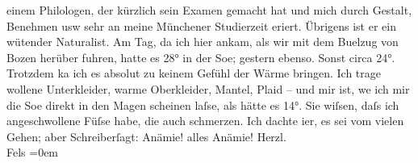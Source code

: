 \begin{ledgroupsized}[t]{13cm}
               einem Philologen, der kürzlich sein Examen gemacht hat und mich durch Gestalt,
               Benehmen usw sehr an meine Münchener
               Studierzeit eri{\geminationn}ert. Übrigens ist er ein wütender
               Naturalist.\pend
           \pstart
           Am Tag, da ich hier ankam, als wir mit dem Bu{\geminationm}elzug von
                  Bozen herüber fuhren, hatte es 28° in der
                  So{\geminationn}e; gestern ebenso. Sonst circa 24°. {\pb}Trotzdem ka{\geminationn} ich es
               absolut zu keinem Gefühl der Wärme bringen. Ich trage wollene Unterkleider, warme
               Oberkleider, Mantel, Plaid – und mir ist, we{\geminationn} ich mir
               die So{\geminationn}e direkt in den Magen scheinen laſse, als hätte
               es 14°.\pend
           \pstart
           Sie wiſsen, daſs ich angeschwollene Füſse habe, die auch schmerzen. Ich dachte i{\geminationm}er, es sei vom vielen Gehen; aber Schreiberſagt: Anämie! alles Anämie!\pend
           \pstart
           Herzl. {\\[\baselineskip]}\spacefill\mbox{Fels}\pend
           \leftskip=0em{}
         
         \endnumbering{}\end{ledgroupsized}  \newcommand{\dateiname}{L00177}\newcommand{\titel}{Friedrich M. Fels an Arthur Schnitzler, 1[7]. 2. 1893}\newcommand{\editorInnen}{Martin Anton Müller und Gerd-Hermann Susen}
      